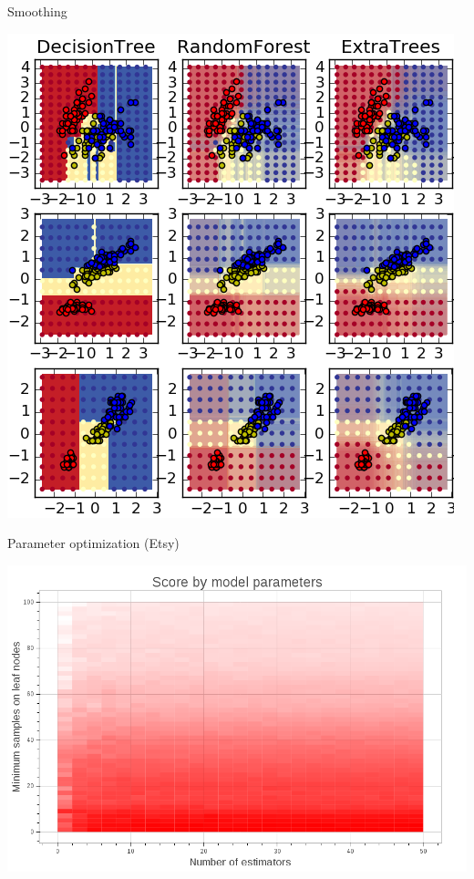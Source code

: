 \begin{frame}[fragile]{Smoothing}
    \begin{center}
        \includegraphics[scale=.40]{images/plot_forest_iris_001}
    \end{center}
\end{frame}

\begin{frame}[fragile]{Parameter optimization (Etsy)}
    \begin{center}
        \includegraphics[scale=.25]{images/heatmap_nestim_minsamp}
    \end{center}
\end{frame}


